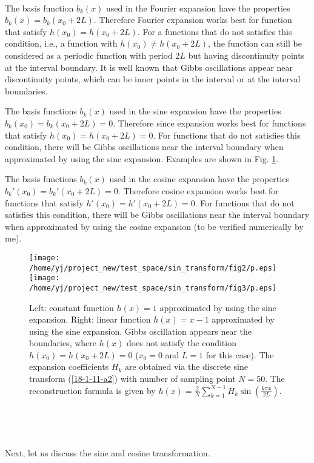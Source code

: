 \documentclass{article}
\begin{document}
\

The basis function $b_k (x)$ used in the Fourier expansion have the
properties $b_k (x) = b_k (x_0 + 2 L)$. Therefore Fourier expansion works best
for function that satisfy $h (x_0) = h (x_0 + 2 L)$. For a functions that do
not satisfies this condition, i.e., a function with $h (x_0) \neq h (x_0 + 2
L)$, the function can still be considered as a periodic function with period
$2 L$ but having discontinuity points at the interval boundary. It is well
known that Gibbs oscillations appear near discontinuity points, which can be
inner points in the interval or at the interval boundaries.

The basis functions $b_k (x)$ used in the sine expansion have the properties
$b_k (x_0) = b_k (x_0 + 2 L) = 0$. Therefore since expansion works best for
functions that satisfy $h (x_0) = h (x_0 + 2 L) = 0$. For functions that do
not satisfies this condition, there will be Gibbs oscillations near the
interval boundary when approximated by using the sine expansion. Examples are
shown in Fig. \ref{18-1-11-a1}.

The basis functions $b_k (x)$ used in the cosine expansion have the properties
$b_k' (x_0) = b_k' (x_0 + 2 L) = 0$. Therefore cosine expansion works best for
functions that satisfy $h' (x_0) = h' (x_0 + 2 L) = 0$. For functions that do
not satisfies this condition, there will be Gibbs oscillations near the
interval boundary when approximated by using the cosine expansion (to be
verified numerically by me).

\begin{figure}[h]
  \texttt{[image: /home/yj/project\_new/test\_space/sin\_transform/fig2/p.eps]}\texttt{[image: /home/yj/project\_new/test\_space/sin\_transform/fig3/p.eps]}
  \caption{\label{18-1-11-a1}Left: constant function $h (x) = 1$ approximated
  by using the sine expansion. Right: linear function $h (x) = x - 1$
  approximated by using the sine expansion. Gibbs oscillation appears near the
  boundaries, where $h (x)$ does not satisfy the condition $h (x_0) = h (x_0 +
  2 L) = 0$ ($x_0 = 0$ and $L = 1$ for this case). The expansion coefficients
  $H_k$ are obtained via the discrete sine transform (\ref{18-1-11-a2}) with
  number of sampling point $N = 50$. The reconstruction formula is given by $h
  (x) = \frac{2}{N} \sum_{k = 1}^{N - 1} H_k \sin ( \frac{k \pi x}{2 L}
  )$.}
\end{figure}

\

\

Next, let us discuss the sine and cosine transformation.
\end{document}
